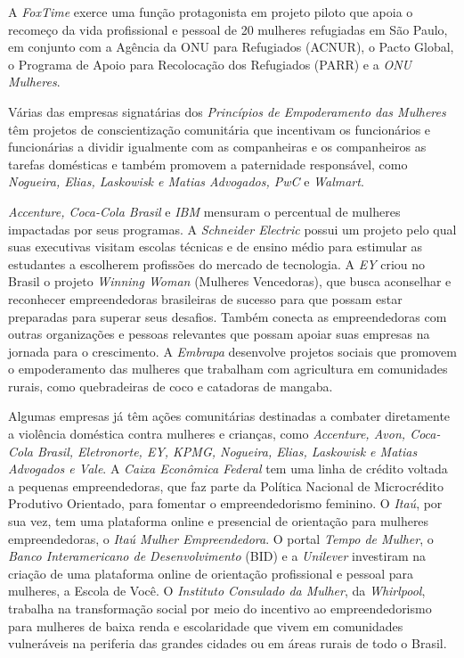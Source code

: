 A \emph{FoxTime} exerce uma função protagonista em projeto piloto que
apoia o recomeço da vida profissional e pessoal de 20 mulheres
refugiadas em São Paulo, em conjunto com a Agência da ONU para
Refugiados (ACNUR), o Pacto Global, o Programa de Apoio para Recolocação
dos Refugiados (PARR) e a \emph{ONU Mulheres}.

Várias das empresas signatárias dos \emph{Princípios de Empoderamento
das Mulheres} têm projetos de conscientização comunitária que incentivam
os funcionários e funcionárias a dividir igualmente com as companheiras
e os companheiros as tarefas domésticas e também promovem a paternidade
responsável, como \emph{Nogueira, Elias, Laskowisk e Matias Advogados,
PwC} e \emph{Walmart}.

\emph{Accenture, Coca-Cola Brasil} e \emph{IBM} mensuram o percentual de
mulheres impactadas por seus programas. A \emph{Schneider Electric}
possui um projeto pelo qual suas executivas visitam escolas técnicas e
de ensino médio para estimular as estudantes a escolherem profissões do
mercado de tecnologia. A \emph{EY} criou no Brasil o projeto
\emph{Winning Woman} (Mulheres Vencedoras), que busca aconselhar e
reconhecer empreendedoras brasileiras de sucesso para que possam estar
preparadas para superar seus desafios. Também conecta as empreendedoras
com outras organizações e pessoas relevantes que possam apoiar suas
empresas na jornada para o crescimento. A \emph{Embrapa} desenvolve
projetos sociais que promovem o empoderamento das mulheres que trabalham
com agricultura em comunidades rurais, como quebradeiras de coco e
catadoras de mangaba.

Algumas empresas já têm ações comunitárias destinadas a combater
diretamente a violência doméstica contra mulheres e crianças, como
\emph{Accenture, Avon, Coca-Cola Brasil, Eletronorte, EY, KPMG,
Nogueira, Elias, Laskowisk e Matias Advogados e Vale}. A \emph{Caixa
Econômica Federal} tem uma linha de crédito voltada a pequenas
empreendedoras, que faz parte da Política Nacional de Microcrédito
Produtivo Orientado, para fomentar o empreendedorismo feminino. O
\emph{Itaú}, por sua vez, tem uma plataforma online e presencial de
orientação para mulheres empreendedoras, o \emph{Itaú Mulher
Empreendedora}. O portal \emph{Tempo de Mulher}, o \emph{Banco
Interamericano de Desenvolvimento} (BID) e a \emph{Unilever} investiram
na criação de uma plataforma online de orientação profissional e pessoal
para mulheres, a Escola de Você. O \emph{Instituto Consulado da Mulher},
da \emph{Whirlpool}, trabalha na transformação social por meio do
incentivo ao empreendedorismo para mulheres de baixa renda e
escolaridade que vivem em comunidades vulneráveis na periferia das
grandes cidades ou em áreas rurais de todo o Brasil.

